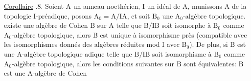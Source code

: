 \uline{Corollaire} .8. Soient $\mathrm A$ un anneau  noethérien, $\mathrm I$ un idéal de $\mathrm A$, munissons $\mathrm A$ de la topologie $\mathrm I$-préadique, posons $\mathrm A_0=\mathrm A/\mathrm{IA}$, et soit $\mathrm B_0$ une $\mathrm A_0$-algèbre topologique.  existe une algèbre de Cohen $\mathrm B$ sur $\mathrm A$ telle que $\mathrm B/\mathrm{IB}$ soit isomorphe à $\mathrm B_0$ comme $\mathrm A_0$-algèbre topologique, alors $\mathrm B$ est unique à  isomorphisme près  (compatible avec les isomorphismes donnés des algèbres  réduites mod $\mathrm I$ avec $\mathrm B_0$). De plus, si $\mathrm B$ est une $\mathrm A$-algèbre topologique adique telle que $\mathrm B/\mathrm{IB}$ soit isomorphisme à $\mathrm B_0$ comme $\mathrm A_0$-algèbre topologique, alors les conditions suivantes sur $\mathrm B$ sont équivalentes:  $\mathrm B$ est une $\mathrm A$-algèbre de Cohen
